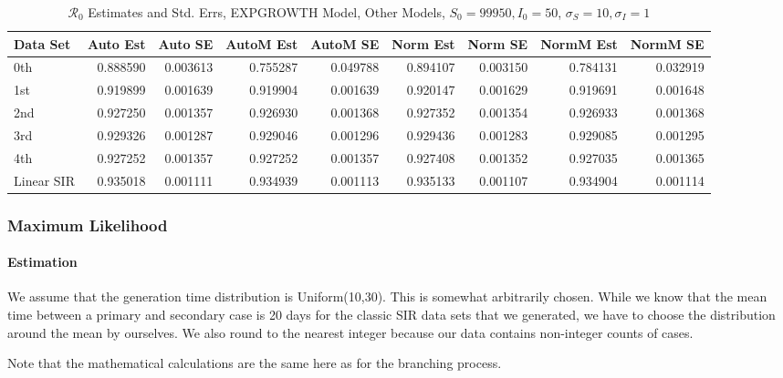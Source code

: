 \documentclass[12pt]{article}
\newcommand{\rr}{\ensuremath{\mathcal{R}_0}}
\begin{document}
\begin{table}[H]
	
	\caption{$\rr$ Estimates and Std. Errs, EXPGROWTH Model,
		Other Models, $S_0 = 99950, I_0 = 50$, 
		$\sigma_S = 10, \sigma_I = 1$}
	\begin{footnotesize}
		\hskip -1cm
	\begin{tabular}{l|r|r|r|r|r|r|r|r}
		\hline
		Data Set & Auto Est & Auto SE & AutoM Est & AutoM SE & Norm Est & Norm SE & NormM Est & NormM SE\\
		\hline
		0th & 0.888590 & 0.003613 & 0.755287 & 0.049788 & 0.894107 & 0.003150 & 0.784131 & 0.032919\\
		\hline
		1st & 0.919899 & 0.001639 & 0.919904 & 0.001639 & 0.920147 & 0.001629 & 0.919691 & 0.001648\\
		\hline
		2nd & 0.927250 & 0.001357 & 0.926930 & 0.001368 & 0.927352 & 0.001354 & 0.926933 & 0.001368\\
		\hline
		3rd & 0.929326 & 0.001287 & 0.929046 & 0.001296 & 0.929436 & 0.001283 & 0.929085 & 0.001295\\
		\hline
		4th & 0.927252 & 0.001357 & 0.927252 & 0.001357 & 0.927408 & 0.001352 & 0.927035 & 0.001365\\
		\hline
		Linear SIR & 0.935018 & 0.001111 & 0.934939 & 0.001113 & 0.935133 & 0.001107 & 0.934904 & 0.001114\\
		\hline
	\end{tabular}
\end{footnotesize}
\end{table}

\subsubsection{Maximum Likelihood}

\paragraph{Estimation}

We assume that the generation time distribution is Uniform(10,30). This is somewhat arbitrarily chosen. While we know that the mean time between a primary and secondary case is 20 days for the classic SIR data sets that we generated, we have to choose the distribution around the mean by ourselves. We also round to the nearest integer because our data contains non-integer counts of cases.

Note that the mathematical calculations are the same here as for the branching process.
\end{document}
